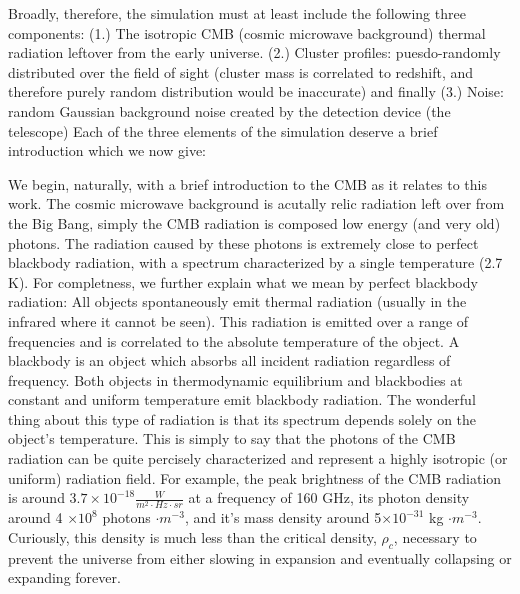 \documentclass[12pt]{article} %
\begin{document}
Broadly, therefore, the simulation must at least include the following three components: (1.) The isotropic CMB (cosmic microwave background) thermal radiation leftover from the early universe. (2.) Cluster profiles: puesdo-randomly distributed over the field of sight  (cluster mass is correlated to redshift, and therefore purely random distribution would be inaccurate) and finally (3.) Noise: random Gaussian background noise created by the detection device (the telescope)  Each of the three elements of the simulation deserve a brief introduction which we now give: 

We begin, naturally, with a brief introduction to the CMB as it relates to this work.  The cosmic microwave background is acutally relic radiation left over from the Big Bang, simply the CMB radiation is composed low energy (and very old) photons. The radiation caused by these photons is extremely close to perfect blackbody radiation, with a spectrum characterized by a single temperature (2.7 K). For completness, we further explain what we mean by perfect blackbody radiation: All objects spontaneously emit thermal radiation (usually in the infrared where it cannot be seen). This radiation is emitted over a range of frequencies and is correlated to the absolute temperature of the object. A blackbody is an object which absorbs all incident radiation regardless of frequency. Both objects in thermodynamic equilibrium and blackbodies at constant and uniform temperature emit blackbody radiation. The wonderful thing about this type of radiation is that its spectrum depends solely on the object's temperature. This is simply to say that the photons of the CMB radiation can be quite percisely characterized and represent a highly isotropic (or uniform) radiation field. For example, the peak brightness of the CMB radiation is around $3.7 \times 10^{-18} \frac{W}{m^{2} \cdot Hz \cdot sr}$  at a frequency of 160 GHz, its photon density around 4 $\times 10^{8}$ photons $\cdot m^{-3}$, and it's mass density around 5$\times 10^{-31}$ kg $\cdot m^{-3}$. Curiously, this density is much less than the critical density, $\rho_c$, necessary to prevent the universe from either slowing in expansion and eventually collapsing or expanding forever. 
\end{document}
